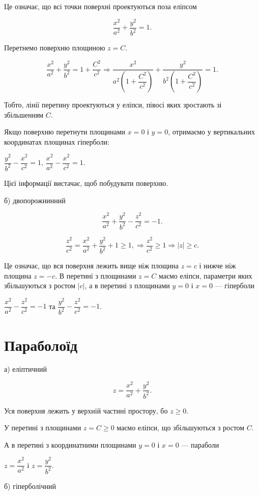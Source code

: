 Це означає, що всі точки поверхні проектуються поза еліпсом

$$\dfrac{x^2}{a^2} + \dfrac{y^2}{b^2} = 1.$$

Перетнемо поверхню площиною $z = C$. 

$$\dfrac{x^2}{a^2} + \dfrac{y^2}{b^2} = 1 + \dfrac{C^2}{c^2} \Rightarrow 
\dfrac{x^2}{a^2\left(1+\dfrac{C^2}{c^2}\right)} + \dfrac{y^2}{b^2\left(1+\dfrac{C^2}{c^2}\right)} = 1.$$


Тобто, лінії перетину проектуються у еліпси, півосі яких зростають зі
збільшенням $C$.

Якщо поверхню перетнути площинами $x = 0$ і $y = 0$, отримаємо у
вертикальних координатах площинах гіперболи: 

$\dfrac{y^2}{b^2} - \dfrac{x^2}{c^2} = 1$, $\dfrac{x^2}{a^2} - \dfrac{x^2}{c^2} = 1$.


Цієї інформації вистачає, щоб побудувати поверхню.


б) двопорожнинний

$$\dfrac{x^2}{a^2} + \dfrac{y^2}{b^2} - \dfrac{z^2}{c^2} = -1.$$

$$\dfrac{z^2}{c^2} = \dfrac{x^2}{a^2} + \dfrac{y^2}{b^2} + 1 \geqslant 1, \Rightarrow
\dfrac{z^2}{c^2} \geqslant 1 \Rightarrow |z| \geqslant c.$$

Це означає, що вся поверхня лежить вище ніж площина $z = c$ і нижче
ніж площина $z = -c$. В перетині з площинами $z = C$ маємо еліпси, параметри 
яких збільшуються з ростом $|c|$, а в перетині з площинами $y = 0$ і $x = 0$ ---
гіперболи

$\dfrac{x^2}{a^2} - \dfrac{z^2}{c^2} = -1$ та $\dfrac{y^2}{b^2} - \dfrac{z^2}{c^2} = -1$.


\section{Параболоїд}

а) еліптичний

$$z = \dfrac{x^2}{a^2} + \dfrac{y^2}{b^2}.$$

Уся поверхня лежить у верхній частині простору, бо $z \geqslant 0$.

У перетині з площинами $z = C \geqslant 0$ маємо еліпси, що збільшуються з
ростом $C$.

А в перетині з координатними площинами $y = 0$ і $x = 0$ --- параболи

$z = \dfrac{x^2}{a^2}$ і $z = \dfrac{y^2}{b^2}$.



б) гіперболічний

